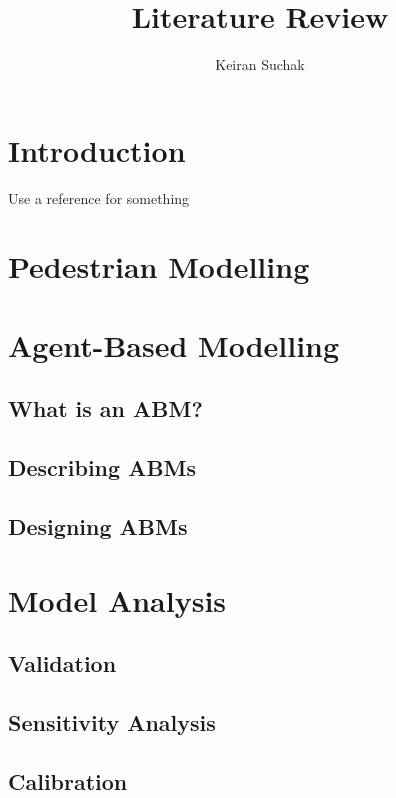\documentclass[11pt,a4paper]{article}
\begin{document}
\title{Literature Review}
\author{Keiran Suchak}

\maketitle

\section{Introduction}
\label{sec:intro}

Use a reference for something \citep{railsback2011agent}

\section{Pedestrian Modelling}
\label{sec:pedestrians}

\section{Agent-Based Modelling}
\label{sec:abms}

\subsection{What is an ABM?}
\label{sub:abms:what}

\subsection{Describing ABMs}
\label{sub:abms:description}

\subsection{Designing ABMs}
\label{sub:abms:design}

\section{Model Analysis}
\label{sec:analysis}

\subsection{Validation}
\label{sub:analysis:validation}

\subsection{Sensitivity Analysis}
\label{sub:analysis:sensitivity}

\subsection{Calibration}
\label{sub:analysis:calibration}



\label{bib}
\end{document}
